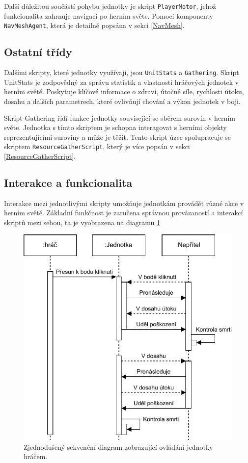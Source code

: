 Další důležitou součástí pohybu jednotky je skript \texttt{PlayerMotor}, jehož funkcionalita zahrnuje navigaci po herním světe. Pomocí komponenty \texttt{NavMeshAgent}, která je detailně popsána v sekci \ref{NavMesh}.

\subsection{Ostatní třídy}
Dalšími skripty, které jednotky využívají, jsou \texttt{UnitStats} a \texttt{Gathering}. Skript UnitStats je zodpovědný za správu statistik a vlastností hráčových jednotek v herním světě. Poskytuje klíčové informace o zdraví, útočné síle, rychlosti útoku, dosahu a dalších parametrech, které ovlivňují chování a výkon jednotek v boji. 

Skript Gathering řídí funkce jednotky související se sběrem surovin v herním světe. Jednotka s tímto skriptem je schopna interagovat s herními objekty reprezentujícími suroviny a může je těžit. Tento skript úzce spolupracuje se skriptem \texttt{ResourceGatherScript}, který je více popsán v sekci \ref{ResourceGatherScript}.

\subsection{Interakce a funkcionalita}
Interakce mezi jednotlivými skripty umožňuje jednotkám provádět různé akce v herním světě. Základní funkčnost je zaručena správnou provázaností a interakcí skriptů mezi sebou, ta je vyobrazena na diagramu \ref{UnitControlRelation}

\begin{figure}[H]
	\centering
	\includegraphics[scale=1]{obrazky-figures/PlayerSequence.pdf}
	\caption{Zjednodušený sekvenční diagram zobrazující ovládání jednotky hráčem.}
	\label{UnitControlRelation}
\end{figure}

